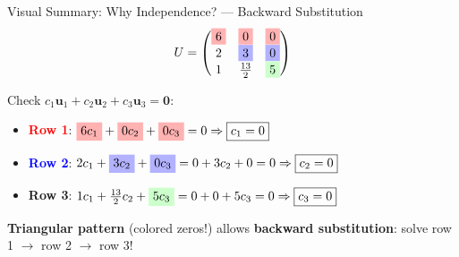\documentclass[10pt]{beamer}
\theoremstyle{definition}
\newcommand{\x}[1]{\alert{\textbf{#1}}}
\begin{document}
\begin{frame}[fragile]{Visual Summary: Why Independence? — Backward Substitution}
$$U = \begin{pmatrix}
\tikz[baseline=(char.base)]{\node[fill=red!30] (char) {6};} & \tikz[baseline=(char.base)]{\node[fill=red!30] (char) {0};} & \tikz[baseline=(char.base)]{\node[fill=red!30] (char) {0};} \\
2 & \tikz[baseline=(char.base)]{\node[fill=blue!30] (char) {3};} & \tikz[baseline=(char.base)]{\node[fill=blue!30] (char) {0};} \\
1 & \frac{13}{2} & \tikz[baseline=(char.base)]{\node[fill=green!20] (char) {5};}
\end{pmatrix}$$

\vfill
Check $c_1\mathbf{u}_1 + c_2\mathbf{u}_2 + c_3\mathbf{u}_3 = \mathbf{0}$:

\vfill
\begin{itemize}
\item \textcolor{red}{\textbf{Row 1}}: $\tikz[baseline=(char.base)]{\node[fill=red!30] (char) {$6c_1$};} + \tikz[baseline=(char.base)]{\node[fill=red!30] (char) {$0c_2$};} + \tikz[baseline=(char.base)]{\node[fill=red!30] (char) {$0c_3$};} = 0 \Rightarrow \boxed{c_1 = 0}$

\vfill
\item \textcolor{blue}{\textbf{Row 2}}: $2c_1 + \tikz[baseline=(char.base)]{\node[fill=blue!30] (char) {$3c_2$};} + \tikz[baseline=(char.base)]{\node[fill=blue!30] (char) {$0c_3$};} = 0 + 3c_2 + 0 = 0 \Rightarrow \boxed{c_2 = 0}$

\vfill
\item \textcolor{green!50!black}{\textbf{Row 3}}: $1c_1 + \frac{13}{2}c_2 + \tikz[baseline=(char.base)]{\node[fill=green!20] (char) {$5c_3$};} = 0 + 0 + 5c_3 = 0 \Rightarrow \boxed{c_3 = 0}$
\end{itemize}

\vfill
\x{Triangular pattern} (colored zeros!) allows \x{backward substitution}: solve row 1 $\to$ row 2 $\to$ row 3!
\end{frame}
\end{document}
